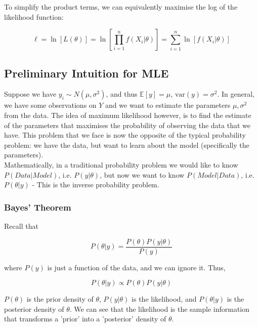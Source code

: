 \documentclass{article}
\begin{document}
\noindent To simplify the product terms, we can equivalently maximise the log of the likelihood function:

\begin{equation}
    \ell = \ln [L(\theta)] = \ln \left[\prod_{i=1}^{n} f(X_i \vert \theta)\right] = \sum_{i=1}^{n} \ln [f(X_i \vert \theta)]
\end{equation}

\subsection{Preliminary Intuition for MLE}
Suppose we have $y_i \sim N(\mu, \sigma^{2})$, and thus $\mathbb{E}[y] = \mu$, $\text{var}(y) = \sigma^{2}$. In general, we have some observations on $Y$ and we want to estimate the parameters $\mu, \sigma^{2}$ from the data. The idea of maximum likelihood however, is to find the estimate of the parameters that maximises the probability of observing the data that we have. This problem that we face is now the opposite of the typical probability problem: we have the data, but want to learn about the model (specifically the parameters). \\

\noindent Mathematically, in a traditional probability problem we would like to know $P(Data\vert Model)$, i.e. $P(y\vert \theta)$, but now we want to know $P(Model \vert Data)$, i.e. $P(\theta\vert y)$ - This is the inverse probability problem. 

\subsubsection{Bayes' Theorem}
Recall that 

\begin{equation}
    P(\theta\vert y) = \frac{P(\theta)P(y\vert\theta)}{P(y)}
\end{equation}

\noindent where $P(y)$ is just a function of the data, and we can ignore it. Thus, 

\begin{equation}\label{eqn:mlepropto}
    P(\theta\vert y) \propto P(\theta) P(y\vert\theta)
\end{equation}

\noindent $P(\theta)$ is the prior density of $\theta$, $P(y\vert \theta)$ is the likelihood, and $P(\theta\vert y)$ is the posterior density of $\theta$. We can see that the likelihood is the sample information that transforms a 'prior' into a 'posterior' density of $\theta$. \\
\end{document}
